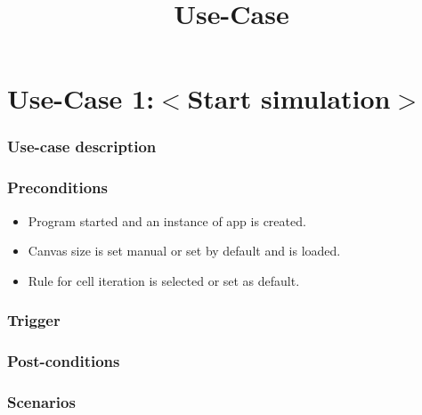 \documentclass[notitlepage]{article}
\date{}
\author{}
\title{#1}
\begin{document}
   \title{\Huge Use-Case}

\vspace{-2cm}%

\part{\LARGE Use-Case 1:$<$Start simulation$>$}

\section{Use-case description}

\begin{comment}
	{\noindent The program will start the cell simulation till it ends.}
\end{comment}


\section{Preconditions}

\begin{itemize}
	\item Program started and an instance of app is created.
	\item Canvas size is set manual or set by default and is loaded.
	\item Rule for cell iteration is selected or set as default.
\end{itemize}

\section{Trigger}\label{sec:trigger}

\begin{comment}
     \noindent Start button is clicked
\end{comment}

\section{Post-conditions}\label{sec:postconditions}

\begin{comment}
     \noindent Frame collection is created based on rule selection. Simulation thread will be created and start running.
\end{comment}

\section{Scenarios}\label{sec:scenarios}
\end{document}
